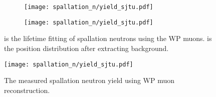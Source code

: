 \begin{figure}[htbp]
	\centering
	\begin{subfigure}{0.5\textwidth}
		\centering
		\texttt{[image: spallation\_n/yield\_sjtu.pdf]}
		\caption{}
		\label{fig:yield_sjtu8}
	\end{subfigure}%
	\begin{subfigure}{0.5\textwidth}
		\centering
		\texttt{[image: spallation\_n/yield\_sjtu.pdf]}
		\caption{}
		\label{fig:yield_sjtu11}
	\end{subfigure}
	\caption{ is the lifetime fitting of spallation neutrons using the WP muons.  is the position distribution after extracting background.}
	\label{fig:yield_sjtu_yield}
\end{figure}


\begin{figure}[htbp]
	\centering
	\texttt{[image: spallation\_n/yield\_sjtu.pdf]}
	\caption{The measured spallation neutron yield using WP muon reconstruction.}
	\label{fig:yield_sjtu22}
\end{figure}
